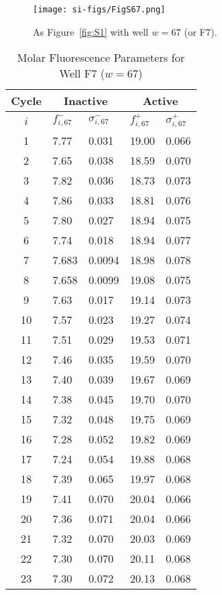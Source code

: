                 \begin{figure}
                    \centering
                    \texttt{[image: si-figs/FigS67.png]}
                    \caption{
                        As Figure~\ref{fig:S1} with well $w=67$ (or F7).
                    }
                \end{figure}
                \clearpage
    \begin{table}
        \caption{Molar Fluorescence Parameters for Well F7 ($w=67$)}
        \centering
        \begin{tabular}{c|ll|ll}
            Cycle & \multicolumn{2}{c|}{Inactive} & \multicolumn{2}{c}{Active} \\
            \hline
            $i$ & $f_{i,67}^{-}$ & $\sigma_{i,67}^{-}$ &  $f_{i,67}^{+}$ & $\sigma_{i,67}^{+}$ \\
            \hline
    1 & 7.77 & 0.031 & 19.00 & 0.066 \\
2 & 7.65 & 0.038 & 18.59 & 0.070 \\
3 & 7.82 & 0.036 & 18.73 & 0.073 \\
4 & 7.86 & 0.033 & 18.81 & 0.076 \\
5 & 7.80 & 0.027 & 18.94 & 0.075 \\
6 & 7.74 & 0.018 & 18.94 & 0.077 \\
7 & 7.683 & 0.0094 & 18.98 & 0.078 \\
8 & 7.658 & 0.0099 & 19.08 & 0.075 \\
9 & 7.63 & 0.017 & 19.14 & 0.073 \\
10 & 7.57 & 0.023 & 19.27 & 0.074 \\
11 & 7.51 & 0.029 & 19.53 & 0.071 \\
12 & 7.46 & 0.035 & 19.59 & 0.070 \\
13 & 7.40 & 0.039 & 19.67 & 0.069 \\
14 & 7.38 & 0.045 & 19.70 & 0.070 \\
15 & 7.32 & 0.048 & 19.75 & 0.069 \\
16 & 7.28 & 0.052 & 19.82 & 0.069 \\
17 & 7.24 & 0.054 & 19.88 & 0.068 \\
18 & 7.39 & 0.065 & 19.97 & 0.068 \\
19 & 7.41 & 0.070 & 20.04 & 0.066 \\
20 & 7.36 & 0.071 & 20.04 & 0.066 \\
21 & 7.32 & 0.070 & 20.03 & 0.069 \\
22 & 7.30 & 0.070 & 20.11 & 0.068 \\
23 & 7.30 & 0.072 & 20.13 & 0.068 \\

\end{tabular}
\end{table}
